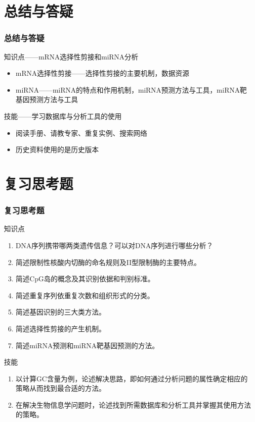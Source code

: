\section{总结与答疑}
\begin{frame}
  \frametitle{总结与答疑}
  \begin{block}{知识点——mRNA选择性剪接和miRNA分析}
    \begin{itemize}
      \item mRNA选择性剪接——选择性剪接的主要机制，数据资源
      \item miRNA——miRNA的特点和作用机制，miRNA预测方法与工具，miRNA靶基因预测方法与工具
    \end{itemize}
  \end{block}
  \begin{block}{技能——学习数据库与分析工具的使用}
    \begin{itemize}
      \item 阅读手册、请教专家、重复实例、搜索网络
      \item 历史资料使用的是历史版本
    \end{itemize}
  \end{block}
\end{frame}

\section{复习思考题}
\begin{frame}
  \frametitle{复习思考题}
  \begin{block}{知识点}
  \begin{enumerate}
    \item DNA序列携带哪两类遗传信息？可以对DNA序列进行哪些分析？
    \item 简述限制性核酸内切酶的命名规则及II型限制酶的主要特点。
    \item 简述CpG岛的概念及其识别依据和判别标准。
    \item 简述重复序列依重复次数和组织形式的分类。
    \item 简述基因识别的三大类方法。
    \item 简述选择性剪接的产生机制。
    \item 简述miRNA预测和miRNA靶基因预测的方法。
  \end{enumerate}
\end{block}
\pause
\begin{block}{技能}
  \begin{enumerate}
    \item 以计算GC含量为例，论述解决思路，即如何通过分析问题的属性确定相应的策略从而找到最合适的方法。
    \item 在解决生物信息学问题时，论述找到所需数据库和分析工具并掌握其使用方法的策略。
  \end{enumerate}
\end{block}
\end{frame}
